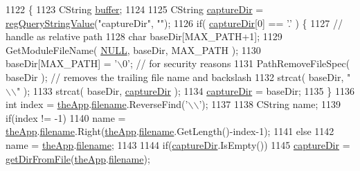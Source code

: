 \begin{DoxyCode}
1122 \{
1123   CString \mbox{\hyperlink{_g_b_a_8cpp_a28d4d3d8445e73a696b2d6f7eadabd96}{buffer}};
1124   
1125   CString \mbox{\hyperlink{_s_d_l_8cpp_a5313171e30454a3da45e3bc3bd338926}{captureDir}} = \mbox{\hyperlink{_reg_8cpp_a618826d274df0d9c19fab2ff28bd9008}{regQueryStringValue}}(\textcolor{stringliteral}{"captureDir"}, \textcolor{stringliteral}{""});
1126   \textcolor{keywordflow}{if}( \mbox{\hyperlink{_s_d_l_8cpp_a5313171e30454a3da45e3bc3bd338926}{captureDir}}[0] == \textcolor{charliteral}{'.'} ) \{
1127       \textcolor{comment}{// handle as relative path}
1128       \textcolor{keywordtype}{char} baseDir[MAX\_PATH+1];
1129       GetModuleFileName( \mbox{\hyperlink{getopt1_8c_a070d2ce7b6bb7e5c05602aa8c308d0c4}{NULL}}, baseDir, MAX\_PATH );
1130       baseDir[MAX\_PATH] = \textcolor{charliteral}{'\(\backslash\)0'}; \textcolor{comment}{// for security reasons}
1131       PathRemoveFileSpec( baseDir ); \textcolor{comment}{// removes the trailing file name and backslash}
1132       strcat( baseDir, \textcolor{stringliteral}{"\(\backslash\)\(\backslash\)"} );
1133       strcat( baseDir, \mbox{\hyperlink{_s_d_l_8cpp_a5313171e30454a3da45e3bc3bd338926}{captureDir}} );
1134       \mbox{\hyperlink{_s_d_l_8cpp_a5313171e30454a3da45e3bc3bd338926}{captureDir}} = baseDir;
1135     \}
1136   \textcolor{keywordtype}{int} index = \mbox{\hyperlink{_v_b_a_8cpp_a8095a9d06b37a7efe3723f3218ad8fb3}{theApp}}.\mbox{\hyperlink{class_v_b_a_a66eee6b61ec8bee20f21164cb0c37d2d}{filename}}.ReverseFind(\textcolor{charliteral}{'\(\backslash\)\(\backslash\)'});
1137   
1138   CString name;
1139   \textcolor{keywordflow}{if}(index != -1)
1140     name = \mbox{\hyperlink{_v_b_a_8cpp_a8095a9d06b37a7efe3723f3218ad8fb3}{theApp}}.\mbox{\hyperlink{class_v_b_a_a66eee6b61ec8bee20f21164cb0c37d2d}{filename}}.Right(\mbox{\hyperlink{_v_b_a_8cpp_a8095a9d06b37a7efe3723f3218ad8fb3}{theApp}}.\mbox{\hyperlink{class_v_b_a_a66eee6b61ec8bee20f21164cb0c37d2d}{filename}}.GetLength()-index-1);
1141   \textcolor{keywordflow}{else}
1142     name = \mbox{\hyperlink{_v_b_a_8cpp_a8095a9d06b37a7efe3723f3218ad8fb3}{theApp}}.\mbox{\hyperlink{class_v_b_a_a66eee6b61ec8bee20f21164cb0c37d2d}{filename}};
1143   
1144   \textcolor{keywordflow}{if}(\mbox{\hyperlink{_s_d_l_8cpp_a5313171e30454a3da45e3bc3bd338926}{captureDir}}.IsEmpty())
1145     \mbox{\hyperlink{_s_d_l_8cpp_a5313171e30454a3da45e3bc3bd338926}{captureDir}} = \mbox{\hyperlink{class_main_wnd_a55c4858ec2c3f621790c9c7aec67011e}{getDirFromFile}}(\mbox{\hyperlink{_v_b_a_8cpp_a8095a9d06b37a7efe3723f3218ad8fb3}{theApp}}.\mbox{\hyperlink{class_v_b_a_a66eee6b61ec8bee20f21164cb0c37d2d}{filename}});

\end{DoxyCode}

